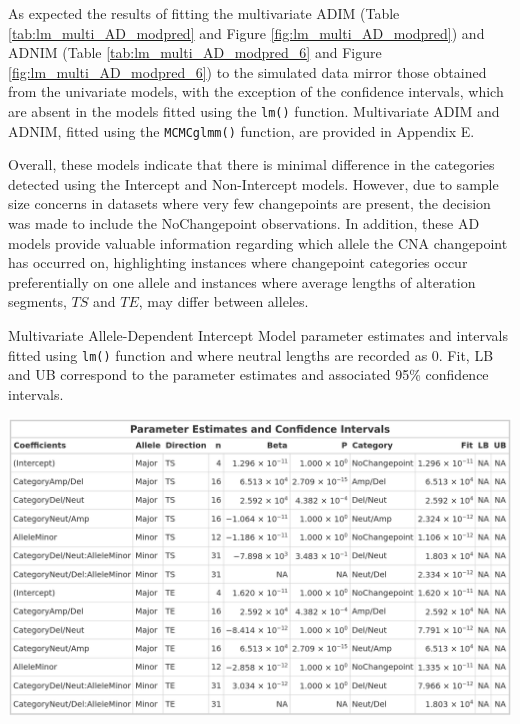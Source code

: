 As expected the results of fitting the multivariate ADIM (Table \ref{tab:lm_multi_AD_modpred} and Figure \ref{fig:lm_multi_AD_modpred}) and ADNIM (Table \ref{tab:lm_multi_AD_modpred_6} and Figure \ref{fig:lm_multi_AD_modpred_6}) to the simulated data mirror those obtained from the univariate models, with the exception of the confidence intervals, which are absent in the models fitted using the \texttt{lm()} function. Multivariate ADIM and ADNIM, fitted using the \texttt{MCMCglmm()} function, are provided in Appendix E.

Overall, these models indicate that there is minimal difference in the categories detected using the Intercept and Non-Intercept models. However, due to sample size concerns in datasets where very few changepoints are present, the decision was made to include the NoChangepoint observations. In addition, these AD models provide valuable information regarding which allele the CNA changepoint has occurred on, highlighting instances where changepoint categories occur preferentially on one allele and instances where average lengths of alteration segments, $TS$ and $TE$, may differ between alleles.

\vfill 
\begin{table}[!h]
\centering
\caption[Multivariate Allele-Dependent Intercept Model parameter estimates and intervals fitted using \texttt{lm()} function.]{Multivariate Allele-Dependent Intercept Model parameter estimates and intervals fitted using \texttt{lm()} function and where neutral lengths are recorded as 0. Fit, LB and UB correspond to the parameter estimates and associated 95\% confidence intervals. }
      
\includegraphics[width = 1\textwidth]{../tables/Chapter_5/Multivariate_lm_7_AD_Model_Pred.png}
\label{tab:lm_multi_AD_modpred}
\end{table}
\vfill 

